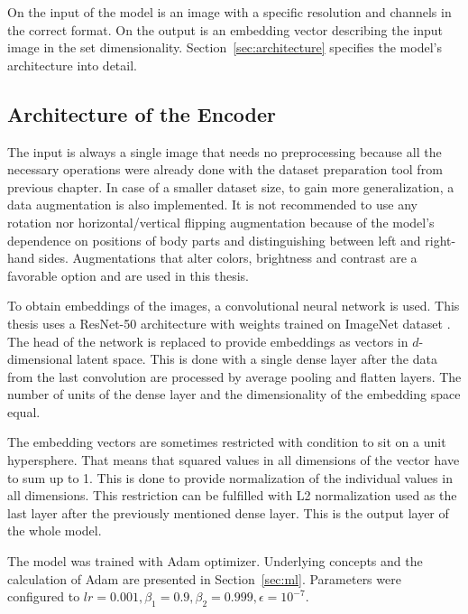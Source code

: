 On the input of the model is an image with a specific resolution and channels in the correct format. On the output is an embedding vector describing the input image in the set dimensionality. Section~\ref{sec:architecture} specifies the model's architecture into detail.

\subsection{\label{sec:architecture}Architecture of the Encoder}

The input is always a single image that needs no preprocessing because all the necessary operations were already done with the dataset preparation tool from previous chapter. In case of a smaller dataset size, to gain more generalization, a data augmentation is also implemented. It is not recommended to use any rotation nor horizontal/vertical flipping augmentation because of the model's dependence on positions of body parts and distinguishing between left and right-hand sides. Augmentations that alter colors, brightness and contrast are a favorable option and are used in this thesis.

To obtain embeddings of the images, a convolutional neural network is used. This thesis uses a ResNet-50 architecture with weights trained on ImageNet dataset \cite{he2015deep-resnet}. The head of the network is replaced to provide embeddings as vectors in $d$-dimensional latent space. This is done with a single dense layer after the data from the last convolution are processed by average pooling and flatten layers. The number of units of the dense layer and the dimensionality of the embedding space equal.

The embedding vectors are sometimes restricted with condition to sit on a unit hypersphere. That means that squared values in all dimensions of the vector have to sum up to 1. This is done to provide normalization of the individual values in all dimensions. This restriction can be fulfilled with L2 normalization used as the last layer after the previously mentioned dense layer. This is the output layer of the whole model.

The model was trained with Adam optimizer. Underlying concepts and the calculation of Adam are presented in Section~\ref{sec:ml}. Parameters were configured to $lr = 0.001, \beta_1 = 0.9, \beta_2 = 0.999, \epsilon = 10^{-7}$.

